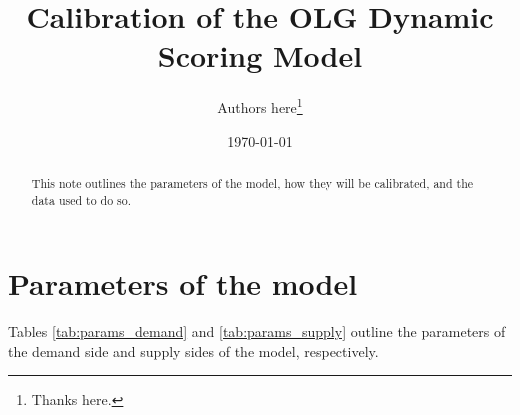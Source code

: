 \documentclass[article,11pt,letterpaper,fleqn]{article}
\author{Authors here\thanks{Thanks here.}}
\title{Calibration of the OLG Dynamic Scoring Model}
\date{\today}
\theoremstyle{definition}
\numberwithin{equation}{section}
\begin{document}

\maketitle



\begin{abstract}
This note outlines the parameters of the model, how they will be calibrated, and the data used to do so.
\end{abstract}

\section{Parameters of the model}
\label{sec:params}

Tables \ref{tab:params_demand} and \ref{tab:params_supply} outline the parameters of the demand side and supply sides of the model, respectively.
\end{document}
